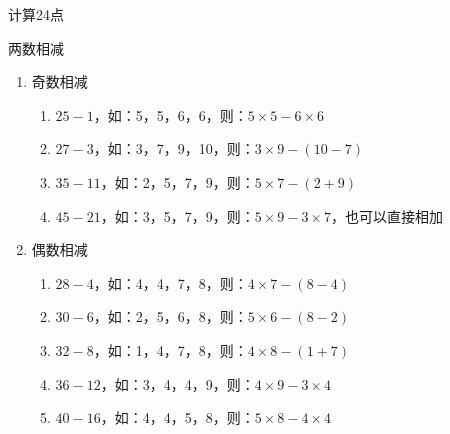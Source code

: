 \documentclass[aspectratio=169]{ctexbeamer} %
\begin{document}
\begin{frame}[t]{计算24点}
\begin{spacing}{1.2}
\normalsize
\alert{两数相减}
\begin{enumerate}[label={\arabic*.}]
\item 奇数相减
	\begin{enumerate}[label={\Alph*.}]
	\item $25 - 1$，如：5，5，6，6，则：$5 \times 5 - 6 \times 6$
	\item $27 - 3$，如：3，7，9，10，则：$3 \times 9 - (10 - 7)$
	\item $35 - 11$，如：2，5，7，9，则：$5 \times 7 - (2 + 9)$	
	\item $45 - 21$，如：3，5，7，9，则：$5 \times 9 - 3 \times 7$，也可以直接相加
	\end{enumerate}
\item 偶数相减
	\begin{enumerate}[label={\Alph*.}]
	\item $28 - 4$，如：4，4，7，8，则：$4 \times 7 - (8 - 4)$
	\item $30 - 6$，如：2，5，6，8，则：$5 \times 6 - (8 - 2)$
	\item $32 - 8$，如：1，4，7，8，则：$4 \times 8 - (1 + 7)$
	\item $36 - 12$，如：3，4，4，9，则：$4 \times 9 - 3 \times 4$
	\item $40 - 16$，如：4，4，5，8，则：$5 \times 8 - 4 \times 4$		
	\end{enumerate}
\end{enumerate}
\end{spacing}
\end{frame}
\end{document}
